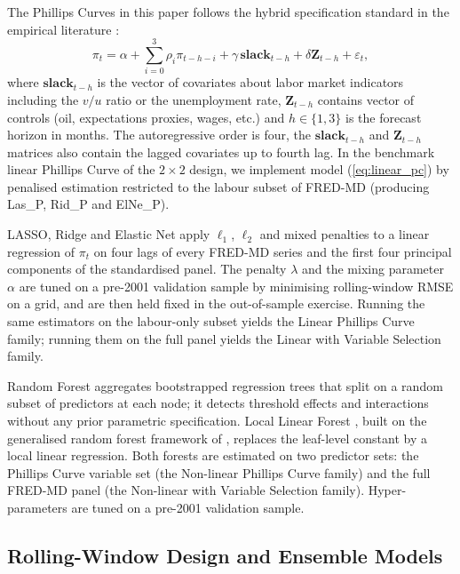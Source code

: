 \documentclass[12pt,a4paper]{article}
\begin{document}
The Phillips Curves in this paper follows the hybrid specification standard in the empirical literature \citep{galigertler1999,benigno2023}:
\begin{equation}
\pi_t = \alpha + \sum_{i=0}^{3} \rho_{i} \pi_{t-h-i} + \gamma \, \mathbf{slack}_{t-h} + \delta \mathbf{Z}_{t-h} + \varepsilon_t,
\label{eq:linear_pc}
\end{equation}
where $\mathbf{slack}_{t-h}$ is the vector of covariates about labor market indicators including the $v/u$ ratio or the unemployment rate, $\mathbf{Z}_{t-h}$ contains vector of controls (oil, expectations proxies, wages, etc.) and $h \in \{1, 3\}$ is the forecast horizon in months. The autoregressive order is four, the $\mathbf{slack}_{t-h}$ and  $\mathbf{Z}_{t-h}$  matrices also contain the lagged covariates up to fourth lag. In the benchmark linear Phillips Curve of the $2 \times 2$ design, we implement model (\ref{eq:linear_pc}) by penalised estimation restricted to the labour subset of FRED-MD (producing Las\_P, Rid\_P and ElNe\_P). 

LASSO, Ridge and Elastic Net \citep{tibshirani1996,zouhastie2005} apply $\ell_1$, $\ell_2$ and mixed penalties to a linear regression of $\pi_t$ on four lags of every FRED-MD series and the first four principal components of the standardised panel. The penalty $\lambda$ and the mixing parameter $\alpha$ are tuned on a pre-2001 validation sample by minimising rolling-window RMSE on a grid, and are then held fixed in the out-of-sample exercise. Running the same estimators on the labour-only subset yields the Linear Phillips Curve family; running them on the full panel yields the Linear with Variable Selection family.

Random Forest \citep{breiman2001} aggregates bootstrapped regression trees that split on a random subset of predictors at each node; it detects threshold effects and interactions without any prior parametric specification. Local Linear Forest \citep{friedberg2021}, built on the generalised random forest framework of \citet{athey2019grf}, replaces the leaf-level constant by a local linear regression. Both forests are estimated on two predictor sets: the Phillips Curve variable set (the Non-linear Phillips Curve family) and the full FRED-MD panel (the Non-linear with Variable Selection family). Hyper-parameters are tuned on a pre-2001 validation sample.

\subsection{Rolling-Window Design and Ensemble Models}
\label{subsec:rolling}
\end{document}

